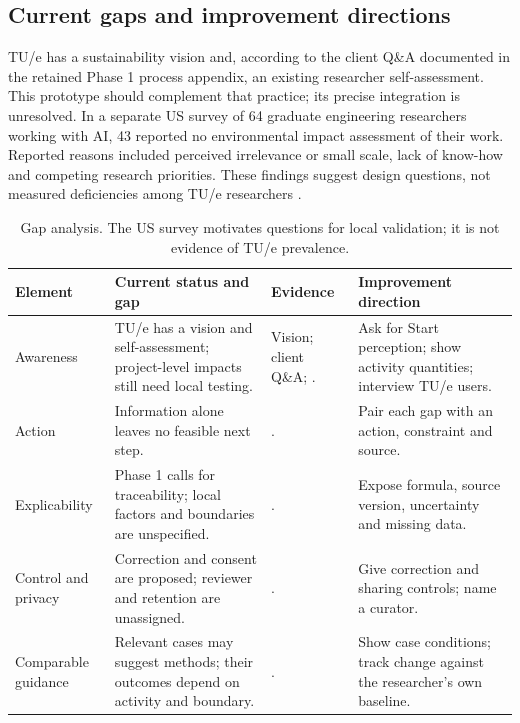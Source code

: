 \documentclass[11pt,a4paper]{article}
\begin{document}
\subsection{Current gaps and improvement directions}
TU/e has a sustainability vision and, according to the client Q\&A documented in the retained Phase 1 process appendix, an existing researcher self-assessment. This prototype should complement that practice; its precise integration is unresolved. In a separate US survey of 64 graduate engineering researchers working with AI, 43 reported no environmental impact assessment of their work. Reported reasons included perceived irrelevance or small scale, lack of know-how and competing research priorities. These findings suggest design questions, not measured deficiencies among TU/e researchers \citep{shiekh2026graduate}.
\begin{table}[H]
\centering\footnotesize
\begin{tabularx}{\textwidth}{@{}>{\raggedright\arraybackslash}p{}>{\raggedright\arraybackslash}p{}>{\raggedright\arraybackslash}p{}>{\raggedright\arraybackslash}X@{}}
\toprule
Element & Current status and gap & Evidence & Improvement direction \\
\midrule
Awareness & TU/e has a vision and self-assessment; project-level impacts still need local testing. & Vision; client Q\&A; \citep{shiekh2026graduate}. & Ask for Start perception; show activity quantities; interview TU/e users. \\
Action & Information alone leaves no feasible next step. & \citep{shiekh2026graduate,abrahamse2005review}. & Pair each gap with an action, constraint and source. \\
Explicability & Phase 1 calls for traceability; local factors and boundaries are unspecified. & \citep{friedman2019shaping}. & Expose formula, source version, uncertainty and missing data. \\
Control and privacy & Correction and consent are proposed; reviewer and retention are unassigned. & \citep{santoni2018control,nissenbaum2004privacy}. & Give correction and sharing controls; name a curator. \\
Comparable guidance & Relevant cases may suggest methods; their outcomes depend on activity and boundary. & \citep{oecd2008composite}. & Show case conditions; track change against the researcher's own baseline. \\
\bottomrule
\end{tabularx}
\caption{Gap analysis. The US survey motivates questions for local validation; it is not evidence of TU/e prevalence.}
\label{tab:phase2-gaps}
\end{table}
\end{document}
